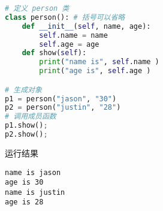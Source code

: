 
\begin{issues}
\issueDraft
\end{issues}

\begin{lstlisting}[language=python]
# 定义 person 类
class person(): # 括号可以省略
    def __init__(self, name, age): 
        self.name = name 
        self.age = age 
    def show(self): 
        print("name is", self.name ) 
        print("age is", self.age ) 

# 生成对象
p1 = person("jason", "30") 
p2 = person("justin", "28")
# 调用成员函数
p1.show();
p2.show();
\end{lstlisting}
运行结果
\begin{lstlisting}
name is jason
age is 30
name is justin
age is 28
\end{lstlisting}
